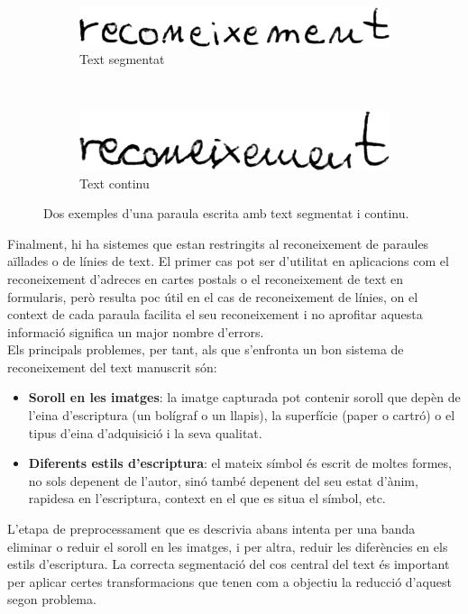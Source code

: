 \begin{figure}
\centering
\begin{subfigure}[b]{0.4\textwidth}
\centering
\includegraphics[width=\textwidth]{images/reconeixement_segmentat.eps}
\caption{Text segmentat}\label{fig:text_segmentat}
\end{subfigure}
~
\begin{subfigure}[b]{0.4\textwidth}
\centering
\includegraphics[width=\textwidth]{images/reconeixement_continu.eps}
\caption{Text continu}\label{fig:text_continu}
\end{subfigure}
\caption{Dos exemples d'una paraula escrita amb text segmentat i continu.}
\end{figure}

Finalment, hi ha sistemes que estan restringits al reconeixement de paraules aïllades o de línies de text. El primer cas pot ser d'utilitat en aplicacions com el reconeixement d'adreces en cartes postals o el reconeixement de text en formularis, però resulta poc útil en el cas de reconeixement de línies, on el context de cada paraula facilita el seu reconeixement i no aprofitar aquesta informació significa un major nombre d'errors.\\

Els principals problemes, per tant, als que s'enfronta un bon sistema de reconeixement del text manuscrit són:
\begin{itemize}
\item \textbf{Soroll en les imatges}: la imatge capturada pot contenir soroll que depèn de l'eina d'escriptura (un bolígraf o un llapis), la superfície (paper o cartró) o el tipus d'eina d'adquisició i la seva qualitat.
\item \textbf{Diferents estils d'escriptura}: el mateix símbol és escrit de moltes formes, no sols depenent de l'autor, sinó també depenent del seu estat d'ànim, rapidesa en l'escriptura, context en el que es situa el símbol, etc.
\end{itemize}

L'etapa de preprocessament que es descrivia abans intenta per una banda eliminar o reduir el soroll en les imatges, i per altra, reduir les diferències en els estils d'escriptura. La correcta segmentació del cos central del text és important per aplicar certes transformacions que tenen com a objectiu la reducció d'aquest segon problema.\\

